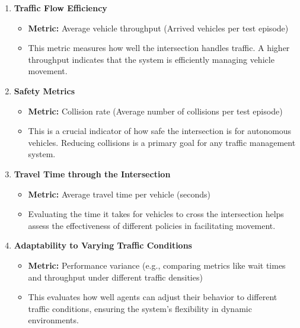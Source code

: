 \begin{enumerate}
    \item \textbf{Traffic Flow Efficiency}
    \begin{itemize}
        \item \textbf{Metric:} Average vehicle throughput (Arrived vehicles per test episode)
        \item This metric measures how well the intersection handles traffic. A higher throughput indicates that the system is efficiently managing vehicle movement.
    \end{itemize}
    
    \item \textbf{Safety Metrics}
    \begin{itemize}
        \item \textbf{Metric:} Collision rate (Average number of collisions per test episode)
        \item This is a crucial indicator of how safe the intersection is for autonomous vehicles. Reducing collisions is a primary goal for any traffic management system.
    \end{itemize}
    
    \item \textbf{Travel Time through the Intersection}
    \begin{itemize}
        \item \textbf{Metric:} Average travel time per vehicle (seconds)
        \item Evaluating the time it takes for vehicles to cross the intersection helps assess the effectiveness of different policies in facilitating movement.
    \end{itemize}
    
    \item \textbf{Adaptability to Varying Traffic Conditions}
    \begin{itemize}
        \item \textbf{Metric:} Performance variance (e.g., comparing metrics like wait times and throughput under different traffic densities)
        \item This evaluates how well agents can adjust their behavior to different traffic conditions, ensuring the system's flexibility in dynamic environments.
    \end{itemize}
\end{enumerate}

